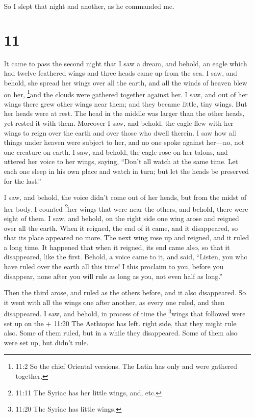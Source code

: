 So I slept that night and another, as he commanded me.

\hypertarget{section-10}{%
\section{11}\label{section-10}}

 It came to pass the second night that I saw a dream, and
behold, an eagle which had twelve feathered wings and three heads came
up from the sea.  I saw, and behold, she spread her wings
over all the earth, and all the winds of heaven blew on her,
\footnote{11:2 So the chief Oriental versions. The Latin has only and
  were gathered together.}and the clouds were gathered together against
her.  I saw, and out of her wings there grew other wings
near them; and they became little, tiny wings.  But her
heads were at rest. The head in the middle was larger than the other
heads, yet rested it with them.  Moreover I saw, and behold,
the eagle flew with her wings to reign over the earth and over those who
dwell therein.  I saw how all things under heaven were
subject to her, and no one spoke against her---no, not one creature on
earth.  I saw, and behold, the eagle rose on her talons, and
uttered her voice to her wings, saying,  ``Don't all watch
at the same time. Let each one sleep in his own place and watch in turn;
 but let the heads be preserved for the last.''

 I saw, and behold, the voice didn't come out of her heads,
but from the midst of her body.  I counted \footnote{11:11
  The Syriac has her little wings, and, etc.}her wings that were near
the others, and behold, there were eight of them.  I saw,
and behold, on the right side one wing arose and reigned over all the
earth.  When it reigned, the end of it came, and it
disappeared, so that its place appeared no more. The next wing rose up
and reigned, and it ruled a long time.  It happened that
when it reigned, its end came also, so that it disappeared, like the
first.  Behold, a voice came to it, and said, 
``Listen, you who have ruled over the earth all this time! I this
proclaim to you, before you disappear,  none after you will
rule as long as you, not even half as long.''

 Then the third arose, and ruled as the others before, and
it also disappeared.  So it went with all the wings one
after another, as every one ruled, and then disappeared.  I
saw, and behold, in process of time the \footnote{11:20 The Syriac has
  little wings.}wings that followed were set up on the + 11:20 The
Aethiopic has left. right side, that they might rule also. Some of them
ruled, but in a while they disappeared.  Some of them also
were set up, but didn't rule.

